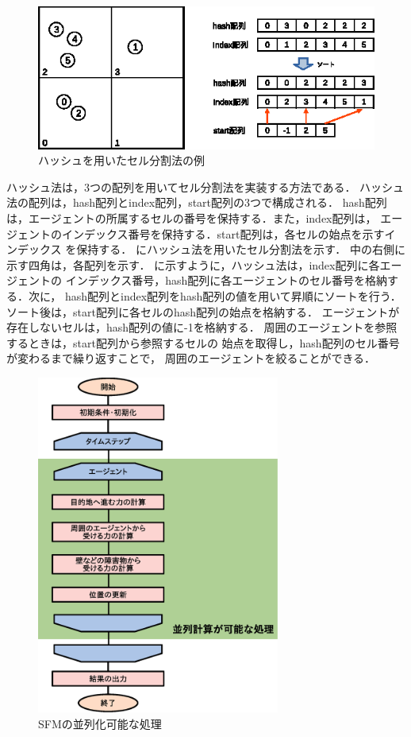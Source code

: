 \begin{figure}[t]
 \begin{center}
  \includegraphics[width=11.5cm,clip]{figure/serubunkatu_hash.eps}
  \caption{ハッシュを用いたセル分割法の例}
  \label{fig:hash}
 \end{center}
\end{figure}

ハッシュ法は，3つの配列を用いてセル分割法を実装する方法である．
ハッシュ法の配列は，hash配列とindex配列，start配列の3つで構成される．
hash配列は，エージェントの所属するセルの番号を保持する．また，index配列は，
エージェントのインデックス番号を保持する．start配列は，各セルの始点を示すインデックス
を保持する．
にハッシュ法を用いたセル分割法を示す．
中の右側に示す四角は，各配列を示す．
に示すように，ハッシュ法は，index配列に各エージェントの
インデックス番号，hash配列に各エージェントのセル番号を格納する．次に，
hash配列とindex配列をhash配列の値を用いて昇順にソートを行う．
ソート後は，start配列に各セルのhash配列の始点を格納する．
エージェントが存在しないセルは，hash配列の値に-1を格納する．
周囲のエージェントを参照するときは，start配列から参照するセルの
始点を取得し，hash配列のセル番号が変わるまで繰り返すことで，
周囲のエージェントを絞ることができる．


\begin{figure}[t]
 \begin{center}
  \includegraphics[width=8cm,clip]{figure/heiretuka_sfm.eps}
  \caption{SFMの並列化可能な処理}
  \label{fig:sfm_heiretu}
 \end{center}
\end{figure}


